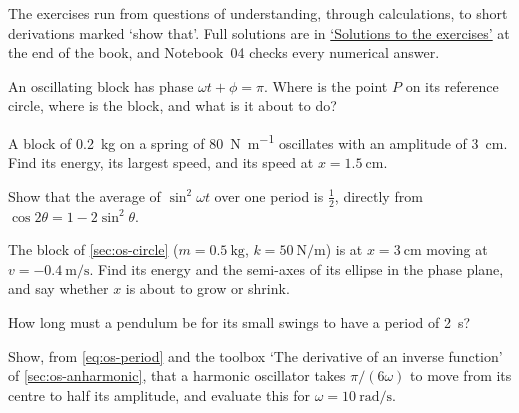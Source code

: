\label{sec:os-exercises}

The exercises run from questions of understanding, through calculations,
to short derivations marked `show that'. Full solutions are in
\hyperref[sec:os-solutions]{`Solutions to the exercises'} at the end of
the book, and Notebook~04 checks every numerical answer.

\begin{exercise}[a phase of $\pi$]
\label{ex:os-phase-pi}
An oscillating block has phase $\omega t + \phi = \pi$. Where is the point
$P$ on its reference circle, where is the block, and what is it about to
do?
\end{exercise}

\begin{exercise}
\label{ex:os-energy}
A block of \SI{0.2}{\kilogram} on a spring of \SI{80}{\newton\per\metre}
oscillates with an amplitude of \SI{3}{\centi\metre}. Find its energy, its
largest speed, and its speed at $x = \SI{1.5}{\centi\metre}$.
\end{exercise}

\begin{exercise}
\label{ex:os-average}
Show that the average of $\sin^2\omega t$ over one period is $\frac12$,
directly from $\cos 2\theta = 1 - 2\sin^2\theta$.
\end{exercise}

\begin{exercise}
\label{ex:os-ellipse}
The block of \cref{sec:os-circle} ($m = \SI{0.5}{\kilogram}$, $k =
\SI{50}{\newton\per\metre}$) is at $x = \SI{3}{\centi\metre}$ moving at
$v = \SI{-0.4}{\metre\per\second}$. Find its energy and the semi-axes of
its ellipse in the phase plane, and say whether $x$ is about to grow or
shrink.
\end{exercise}

\begin{exercise}
\label{ex:os-clock}
How long must a pendulum be for its small swings to have a period of
\SI{2}{\second}?
\end{exercise}

\begin{exercise}
\label{ex:os-arcsine}
Show, from \cref{eq:os-period} and the toolbox `The derivative of an
inverse function' of \cref{sec:os-anharmonic}, that a harmonic
oscillator takes $\pi/(6\omega)$ to move from its centre to half its
amplitude, and evaluate this for $\omega = \SI{10}{\radian\per\second}$.
\end{exercise}

